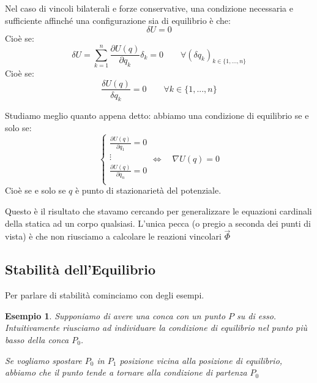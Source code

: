 \documentclass[11pt,a4paper,twoside]{article}
\newtheorem{es}{Esempio}
\theoremstyle{definition}
\begin{document}
\begin{prop}{}{}
	Nel caso di vincoli bilaterali e forze conservative, una condizione necessaria e sufficiente affinché una configurazione sia di equilibrio è che:
	\[ \delta U = 0 \]
	Cioè se:
	\[ \delta U = \sum_{k = 1}^n \frac{\partial U(q)}{\partial q_k}\delta _k = 0 \qquad \forall (\delta q_k)_{k \in \{1,...,n\}}\]
	Cioè se:
	\[ \frac{\delta U(q)}{\delta q_k} = 0\qquad \forall k \in \{1,...,n\} \]
\end{prop}

Studiamo meglio quanto appena detto: abbiamo una condizione di equilibrio se e solo se:
\[
	\begin{cases}
		\frac{\partial U(q)}{\partial q_1} = 0\\
		\vdots\\
		\frac{\partial U(q)}{\partial q_n} = 0\\
	\end{cases}
	\Leftrightarrow \quad \nabla U(q) = 0
\]
Cioè se e solo se $q$ è punto di stazionarietà del potenziale.

Questo è il risultato che stavamo cercando per generalizzare le equazioni cardinali della statica ad un corpo qualsiasi. L'unica pecca (o pregio a seconda dei punti di vista) è che non riusciamo a calcolare le reazioni vincolari $\vec \Phi$

\subsection{Stabilità dell'Equilibrio}

Per parlare di stabilità cominciamo con degli esempi.

\begin{es}
	Supponiamo di avere una conca con un punto $P$ su di esso. Intuitivamente riusciamo ad individuare la condizione di equilibrio nel punto più basso della conca $P_0$.
	\begin{center}
	\end{center}
	Se vogliamo spostare $P_0$ in $P_1$ posizione vicina alla posizione di equilibrio, abbiamo che il punto tende a tornare alla condizione di partenza $P_0$
	\begin{center}
	\end{center}
\end{es}
\end{document}
